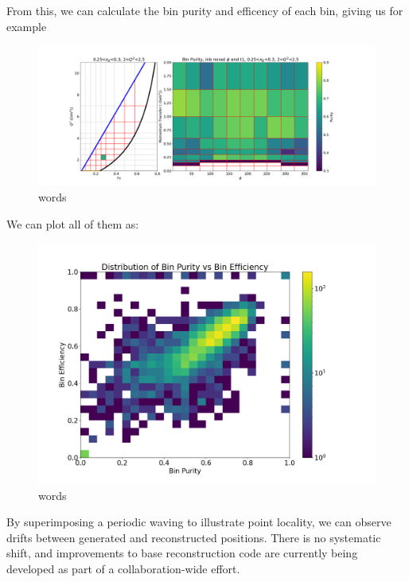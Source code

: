     
    From this, we can calculate the bin purity and efficency of each bin, giving us for example
    
    
    \begin{figure}[ht]
    \centering
    \includegraphics[trim={0 0 0 0},clip,width=\textwidth]{Chapters/Ch5-Further/0_IBU/pics/purities/inb_norad_t1/bin_purity_0.25_0.3_2_2.5.png}
    \caption[words]{words}
    \label{fig:ibu10}
    \end{figure}
    
    
    We can plot all of them as:
    
    
    \begin{figure}[ht]
    \centering
    \includegraphics[trim={0 0 0 0},clip,width=\textwidth]{Chapters/Ch5-Further/0_IBU/pics/overview/t1_bin_purity_vs_bin_efficiency.png}
    \caption[words]{words}
    \label{fig:ibu10}
    \end{figure}

    By superimposing a periodic waving to illustrate point locality, we can observe drifts between generated and reconstructed positions. There is no systematic shift, and improvements to base reconstruction code are currently being developed as part of a collaboration-wide effort. 
    
